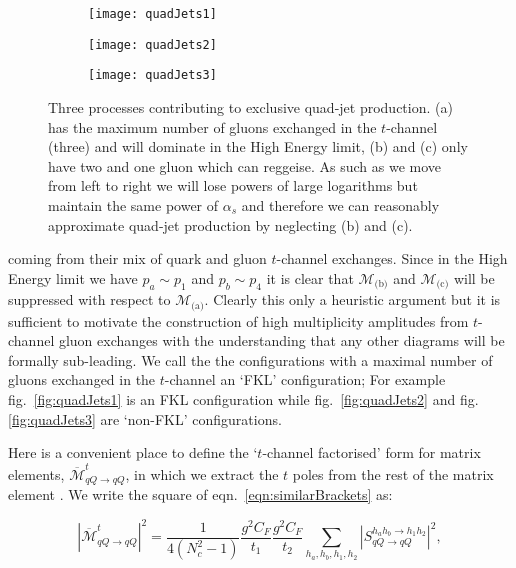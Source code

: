 		\begin{figure}[hbt]
			\centering
			\begin{subfigure}[b]{0.31\textwidth}
				\texttt{[image: quadJets1]}
				\caption{}
				\label{fig:quadJets1}
			\end{subfigure}
			\begin{subfigure}[b]{0.31\textwidth}
				\texttt{[image: quadJets2]}
				\caption{}
				\label{fig:quadJets2}
			\end{subfigure}
			\begin{subfigure}[b]{0.31\textwidth}
				\texttt{[image: quadJets3]}
				\caption{}
				\label{fig:quadJets3}
			\end{subfigure}
			\caption{Three processes contributing to exclusive quad-jet production. (a) has the
			maximum number of gluons exchanged in the $t$-channel (three) and will dominate in the High
			Energy limit, (b) and (c) only have two and one gluon which can reggeise.  As such as we move
			from left to right we will lose powers of large logarithms but maintain the same power of
			$\alpha_s$ and therefore we can reasonably approximate quad-jet production by neglecting
			(b) and (c).}
			\label{fig:quadJets}
		\end{figure}

		coming from their mix of quark and gluon $t$-channel exchanges.  Since in the High
		Energy limit we have $p_a\sim p_1$ and $p_b\sim p_4$ it is clear that $\mathcal{M}_{\text{(b)}}$
		and $\mathcal{M}_{\text{(c)}}$ will be suppressed with respect to $\mathcal{M}_{\text{(a)}}$.
		Clearly this only a heuristic argument but it is sufficient to motivate the construction of
		high multiplicity amplitudes from $t$-channel gluon exchanges with the understanding that any
		other diagrams will be formally sub-leading.  We call the the configurations with a maximal
		number of gluons exchanged in the $t$-channel an `FKL' configuration;  For example
		fig.~\eqref{fig:quadJets1} is an FKL configuration while fig.~\eqref{fig:quadJets2} and fig.
		\eqref{fig:quadJets3} are `non-FKL' configurations.

		Here is a convenient place to define the `$t$-channel factorised' form for matrix elements,
		$\overline{\mathcal{M}}^t_{qQ\rightarrow qQ}$, in which we extract the $t$ poles from the
		rest of the matrix element \cite{Andersen:2009nu}.  We write the square of
		eqn.~\eqref{eqn:similarBrackets} as:

		\begin{equation}
			|\overline{\mathcal{M}}^t_{qQ\rightarrow qQ}|^2 = \frac{1}{4(N_c^2-1)}
			\frac{g^2C_F}{t_1}\frac{g^2C_F}{t_2} \sum_{h_a, h_b, h_1, h_2}
			|S_{qQ\rightarrow qQ}^{h_ah_b\rightarrow h_1h_2}|^2,
			\label{eqn:factorised}
		\end{equation}

